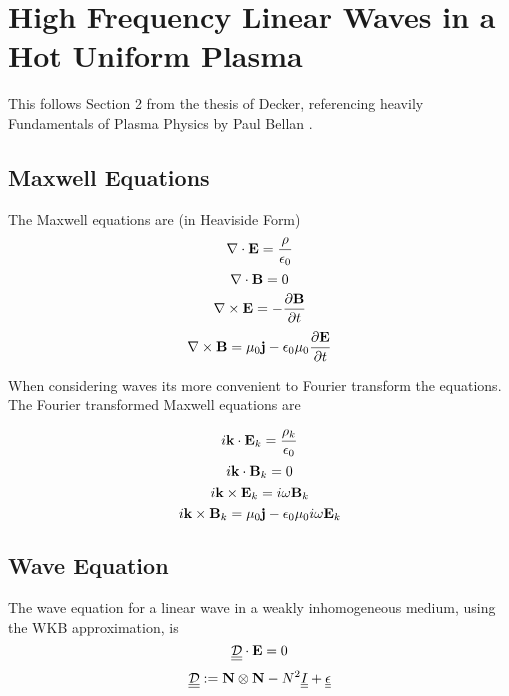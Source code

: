 \section{High Frequency Linear Waves in a Hot Uniform Plasma}
This follows Section 2 from the thesis of Decker, referencing heavily Fundamentals of Plasma Physics by Paul Bellan \cite{bellan2008fundamentals}.

\subsection{Maxwell Equations}
The Maxwell equations are (in Heaviside Form)
\begin{equation}\label{Maxwell 1}
	\nabla \cdot \textbf{E} = \frac{\rho}{\epsilon_0}
\end{equation}
\begin{equation}\label{Maxwell 2}
	\nabla \cdot \textbf{B} = 0
\end{equation}
\begin{equation}\label{Maxwell 3}
	\nabla \times \textbf{E} = -\frac{\partial \textbf{B}}{\partial t}
\end{equation}
\begin{equation}\label{Maxwell 4}
	\nabla \times \textbf{B} = \mu_0 \textbf{j} - \epsilon_0 \mu_0 \frac{\partial \textbf{E}}{\partial t}
\end{equation}

When considering waves its more convenient to Fourier transform the equations. The Fourier transformed Maxwell equations are

\begin{equation}\label{Maxwell 1 FT}
	i\textbf{k} \cdot \textbf{E}_k = \frac{\rho_k}{\epsilon_0}
\end{equation}
\begin{equation}\label{Maxwell 2 FT}
	i\textbf{k} \cdot \textbf{B}_k = 0
\end{equation}
\begin{equation}\label{Maxwell 3 FT}
	i\textbf{k} \times \textbf{E}_k = i \omega \textbf{B}_k
\end{equation}
\begin{equation}\label{Maxwell 4 FT}
	i\textbf{k} \times \textbf{B}_k = \mu_0 \textbf{j} - \epsilon_0 \mu_0 i \omega \textbf{E}_k
\end{equation}

\subsection{Wave Equation}
The wave equation for a linear wave in a weakly inhomogeneous medium, using the WKB approximation, is
\begin{equation}\label{linear_wave_equation}
	\underline{\underline{\mathcal{D}}} \cdot \textbf{E} = 0
\end{equation}
\begin{equation} \label{linear wave equation operator}
	\underline{\underline{\mathcal{D}}} := \textbf{N} \otimes \textbf{N} - N^2 \underline{\underline{I}} + \underline{\underline{\epsilon}}
\end{equation}

